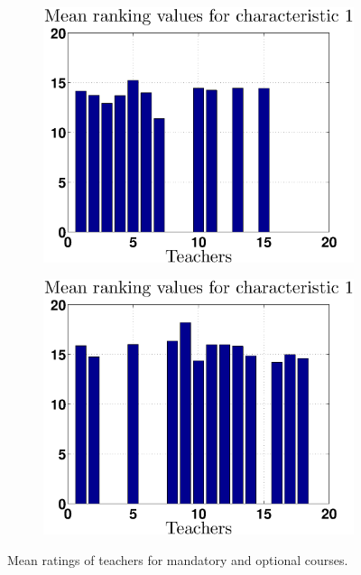 \documentclass[12pt,a4paper]{article}
\begin{document}
\begin{figure}[h!]
\centering
\begin{subfigure}[b]{0.49\textwidth}
    \centering
    \includegraphics[width = \textwidth]{noPreprocess/meanTeachersC1.eps}
\end{subfigure}
\begin{subfigure}[b]{0.49\textwidth}
    \centering
    \includegraphics[width = \textwidth]{noPreprocess/meanTeachersC2.eps}
\end{subfigure}
\caption{Mean ratings of teachers for mandatory and optional courses\label{mean1}.}
\end{figure}
\end{document}
